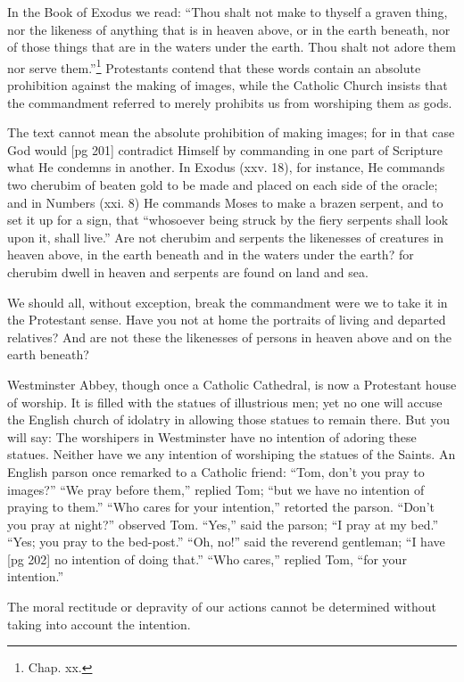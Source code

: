 In the Book of Exodus we read: “Thou shalt
not make to thyself a graven thing, nor the likeness
of anything that is in heaven above, or in
the earth beneath, nor of those things that are in
the waters under the earth. Thou shalt not adore
them nor serve them.”\footnote{Chap. xx.} Protestants contend
that these words contain an absolute prohibition
against the making of images, while the Catholic
Church insists that the commandment referred
to merely prohibits us from worshiping them as
gods.

The text cannot mean the absolute prohibition
of making images; for in that case God would
[pg 201]
contradict Himself by commanding in one part
of Scripture what He condemns in another. In
Exodus (xxv. 18), for instance, He commands
two cherubim of beaten gold to be made and
placed on each side of the oracle; and in Numbers
(xxi. 8) He commands Moses to make a
brazen serpent, and to set it up for a sign, that
“whosoever being struck by the fiery serpents
shall look upon it, shall live.” Are not cherubim
and serpents the likenesses of creatures in
heaven above, in the earth beneath and in the
waters under the earth? for cherubim dwell in
heaven and serpents are found on land and sea.

We should all, without exception, break the commandment
were we to take it in the Protestant
sense. Have you not at home the portraits of
living and departed relatives? And are not these
the likenesses of persons in heaven above and
on the earth beneath?

Westminster Abbey, though once a Catholic
Cathedral, is now a Protestant house of worship.
It is filled with the statues of illustrious men;
yet no one will accuse the English church of idolatry
in allowing those statues to remain there.
But you will say: The worshipers in Westminster
have no intention of adoring these statues.
Neither have we any intention of worshiping the
statues of the Saints. An English parson once
remarked to a Catholic friend: “Tom, don't you
pray to images?” “We pray before them,” replied
Tom; “but we have no intention of praying
to them.” “Who cares for your intention,”
retorted the parson. “Don't you pray at night?”
observed Tom. “Yes,” said the parson; “I pray
at my bed.” “Yes; you pray to the bed-post.”
“Oh, no!” said the reverend gentleman; “I have
[pg 202]
no intention of doing that.” “Who cares,” replied
Tom, “for your intention.”

The moral rectitude or depravity of our actions
cannot be determined without taking into
account the intention.

